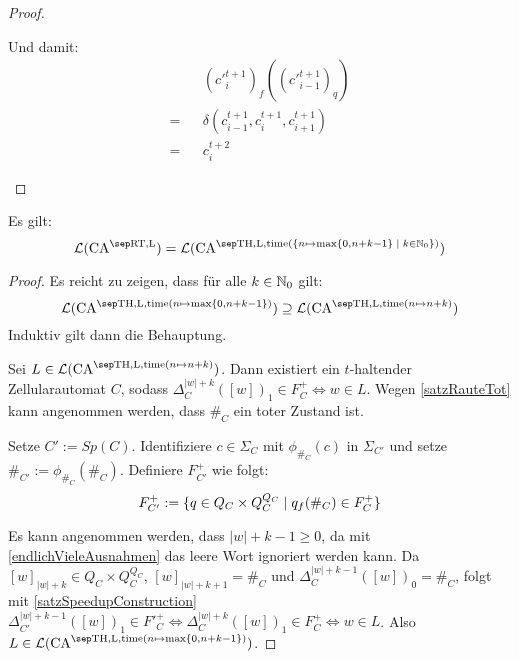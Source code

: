 \begin{proof}
\begin{enumerate}
            Und damit:
            \begin{align*}
                  && (c'^{t+1}_i)_f((c'^{t+1}_{i-1})_q) \\
                = && \delta(c^{t+1}_{i-1}, c^{t+1}_{i}, c^{t+1}_{i+1}) \\
                = && c^{t+2}_i
            \end{align*}
            
            
    \end{enumerate}
\end{proof}

\begin{satz}
    \label{satzRealzeitSpeedup}
    Es gilt:
    \[
        \CAL{\CART, \CALeft} =
            \CAL{\CAT, \CALeft, \mathrm{time}(\set{ n \mapsto \max \finset{0,  n + k - 1} }{ k \in \Nz })}
    \]
\end{satz}
\begin{proof}
    Es reicht zu zeigen, dass für alle $k \in \mathbb{N}_0$ gilt:
    \[
        \CAL{\CAT, \CALeft, \mathrm{time}(
                    n \mapsto \max \finset{0,  n + k - 1}
                )
            }
        \supseteq
        \CAL{\CAT, \CALeft, \mathrm{time}(
                    n \mapsto n + k
                )
            }
    \]
    Induktiv gilt dann die Behauptung.

    Sei $L \in \CAL{\CAT, \CALeft, \mathrm{time}(
                    n \mapsto n + k  )}$.
    Dann existiert ein $t$-haltender Zellularautomat $C$,
    sodass $\Delta_C^{|w|+k}([w])_1 \in F^+_C \Leftrightarrow w \in L$.
    Wegen \cref{satzRauteTot} kann angenommen werden, dass $\#_C$ ein toter Zustand ist.
    
    Setze $C' := Sp(C)$. Identifiziere $c \in \Sigma_C$ mit $\phi_{\#_C}(c)$ in $\Sigma_{C'}$ und setze $\#_{C'} := \phi_{\#_C}(\#_C)$.
    Definiere $F_{C'}^+$ wie folgt: \[
        F_{C'}^+ := \{ { q \in Q_C \times Q_C^{Q_C} } \; | \; { q_f({\#_C}) \in F_C^+ } \}
    \]
    
    Es kann angenommen werden, dass $|w| + k - 1 \geq 0$, da mit \cref{endlichVieleAusnahmen} das leere Wort ignoriert werden kann.
    Da $[w]_{|w|+k} \in Q_C \times Q_C^{Q_C}$, $[w]_{|w|+k+1} = \#_C$ und $\Delta^{|w|+k-1}_C([w])_0 = \#_C$, folgt mit \cref{satzSpeedupConstruction}
    $\Delta_{C'}^{|w|+k-1}([w])_1 \in F'^+_C
    \Leftrightarrow \Delta_C^{|w|+k}([w])_1 \in F^+_C
    \Leftrightarrow w \in L$.
    Also $L \in \CAL{\CAT, \CALeft, \mathrm{time}(
                    n \mapsto \max \finset{0,  n + k - 1}
                )}$.
\end{proof}



